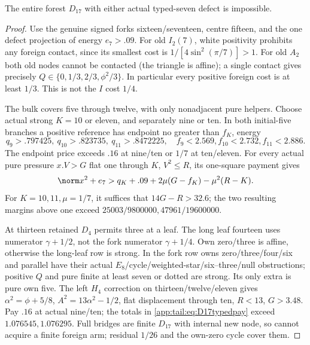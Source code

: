 \begin{lemma}\label{app:tail:lem:D17typed}
The entire forest $D_{17}$ with either actual typed-seven defect
is impossible.
\end{lemma}
\begin{proof}
Use the genuine signed forks sixteen/seventeen, centre fifteen,
and the one defect projection of energy $e_7>.09$.
For old $I_2(7)$, white positivity prohibits any foreign contact,
since its smallest cost is $1/[4\sin^2(\pi/7)]>1$.
For old $A_2$ both old nodes cannot be contacted (the triangle
is affine); a single contact gives precisely
$Q\in\{0,1/3,2/3,\phi^2/3\}$.
In particular every positive foreign cost is at least $1/3$.
This is not the $I$ cost $1/4$.

The bulk covers five through twelve, with only nonadjacent pure
helpers. Choose actual strong $K=10$ or eleven, and separately
nine or ten. In both initial-five branches a positive reference
has endpoint no greater than $f_K$, energy
\[
 q_9>.797425,\ q_{10}>.823735,\ q_{11}>.8472225,
 \quad f_9<2.569,f_{10}<2.732,f_{11}<2.886.
\]
The endpoint price exceeds $.16$ at nine/ten or $1/7$ at
ten/eleven. For every actual pure pressure $x.V>G$ flat one
through $K$, $V^2\le R$, its one-square payment gives
\begin{equation}\label{app:tail:eq:D17typedpay}
 \norm x^2+e_7>q_K+.09+2\mu(G-f_K)-\mu^2(R-K).
\end{equation}
For $K=10,11,\mu=1/7$, it suffices that $14G-R>32.6$;
the two resulting margins above one exceed
$25003/9800000,47961/19600000$.

At thirteen retained $D_4$ permits three at a leaf.
The long leaf fourteen uses numerator $\gamma+1/2$, not
the fork numerator $\gamma+1/4$. Own zero/three is affine,
otherwise the long-leaf row is strong. In the fork row
owns zero/three/four/six and parallel have their actual
$E_8$/cycle/weighted-star/six--three/null obstructions;
positive $Q$ and pure finite at least seven or dotted are
strong. Its only extra is pure own five.
The left $H_4$ correction on thirteen/twelve/eleven gives
$\alpha^2=\phi+5/8$, $A^2=13\alpha^2-1/2$, flat
displacement through ten, $R<13$, $G>3.48$.
Pay $.16$ at actual nine/ten; the totals in
\eqref{app:tail:eq:D17typedpay} exceed $1.076545,1.076295$.
Full bridges are finite $D_{17}$ with internal new node,
so cannot acquire a finite foreign arm; residual $1/26$
and the own-zero cycle cover them.


\end{proof}
